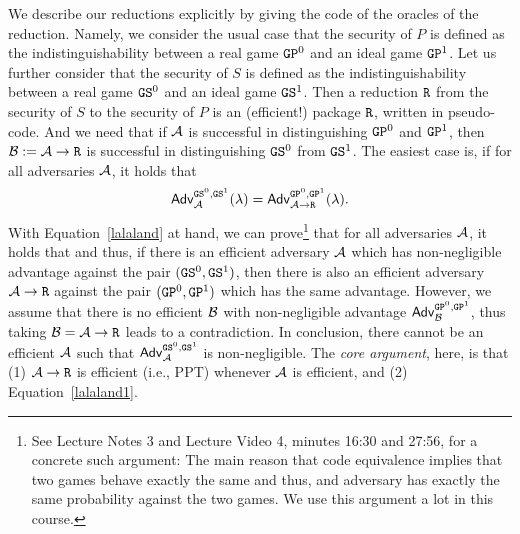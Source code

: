 We describe our reductions explicitly by giving the code of the oracles of the reduction. Namely, we consider the usual case that the security of $P$ is defined as the indistinguishability between a real game $\text{\texttt{GP}}^0$
and an ideal game $\text{\texttt{GP}}^1$. Let us further consider that the security of $S$ is defined as the indistinguishability between
a real game $\text{\texttt{GS}}^0$ and an ideal game $\text{\texttt{GS}}^1$. Then a reduction $\text{\texttt{R}}$ from the security of $S$ to the security of $P$
is an (efficient!) package $\text{\texttt{R}}$, written in pseudo-code. And we need that if $\mathcal{A}$ is successful in distinguishing $\text{\texttt{GP}}^0$ and 
$\text{\texttt{GP}}^1$, then $\mathcal{B}:=\mathcal{A}\rightarrow\text{\texttt{R}}$ is successful in distinguishing $\text{\texttt{GS}}^0$ from $\text{\texttt{GS}}^1$. The easiest case is,
if for all adversaries $\mathcal{A}$, it holds that
\begin{equation}\label{lalaland1}
\mathsf{Adv}^{\text{\texttt{GS}}^0,\text{\texttt{GS}}^1}_{\mathcal{A}}(\lambda)=\mathsf{Adv}^{\text{\texttt{GP}}^0,\text{\texttt{GP}}^1}_{\mathcal{A}\rightarrow\text{\texttt{R}}}(\lambda).
\end{equation}
With Equation~\ref{lalaland} at hand, we can prove\footnote{See Lecture Notes 3 and Lecture Video 4, minutes 16:30 and 27:56, for a concrete such argument: The main reason that code equivalence implies that two games behave exactly the same and thus, and adversary has exactly the same probability against the two games. We use this argument a lot in this course.}  that for all adversaries $\mathcal{A}$, it holds that 
and thus, if there is an efficient adversary $\mathcal{A}$ which has non-negligible advantage against the pair $(\text{\texttt{GS}}^0,\text{\texttt{GS}}^1)$,
then there is also an efficient adversary $\mathcal{A}\rightarrow\text{\texttt{R}}$ against the pair $(\text{\texttt{GP}}^0,\text{\texttt{GP}}^1)$ which has the same
advantage. However, we assume that there is no efficient $\mathcal{B}$ with non-negligible advantage $\mathsf{Adv}^{\text{\texttt{GP}}^0,\text{\texttt{GP}}^1}_{\mathcal{B}}$, thus taking $\mathcal{B}=\mathcal{A}\rightarrow\text{\texttt{R}}$ leads to a contradiction. In conclusion, there cannot be an efficient $\mathcal{A}$ such that $\mathsf{Adv}^{\text{\texttt{GS}}^0,\text{\texttt{GS}}^1}_{\mathcal{A}}$ is non-negligible. The \emph{core argument}, here, is that (1) $\mathcal{A}\rightarrow\text{\texttt{R}}$ is efficient (i.e., PPT) whenever $\mathcal{A}$ is efficient, and (2) Equation~\ref{lalaland1}.

